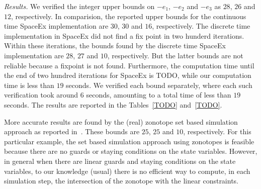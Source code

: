 \emph{Results.}  We verified the integer upper bounds on $-e_1$,
$-e_2$ and $-e_3$ as $28$, $26$ and $12$, respectively.  In
comparision, the reported upper bounds for the continuous time SpaceEx
implementation are $30$, $30$ and $16$, respectively.  The discrete
time implementation in SpaceEx did not find a fix point in two hunderd
iterations.  Within these iterations, the bounds found by the discrete
time SpaceEx implementation are $28$, $27$ and $10$, respectively.
But the latter bounds are not reliable because a fixpoint is not
found.  Furthermore, the computation time until the end of two hundred
iterations for SpaceEx is TODO, while our computation time is less
than $19$ seconds.  We verified each bound separately, where each such
verification took around $6$ seconds, amounting to a total time of
less than $19$ seconds.  The results are reported in the
Tables~\ref{TODO} and~\ref{TODO}.

More accurate results are found by the (real) zonotope set based
simulation approach as reported in~\cite{TODO}.  These bounds are
$25$, $25$ and $10$, respectively.  For this particular example, the
set based simulation approach using zonotopes is feasible because
there are no guards or staying conditions on the state variables.
However, in general when there are linear guards and staying
conditions on the state variables, to our knowledge (usual) there is
no efficient way to compute, in each simulation step, the intersection
of the zonotope with the linear constraints.


